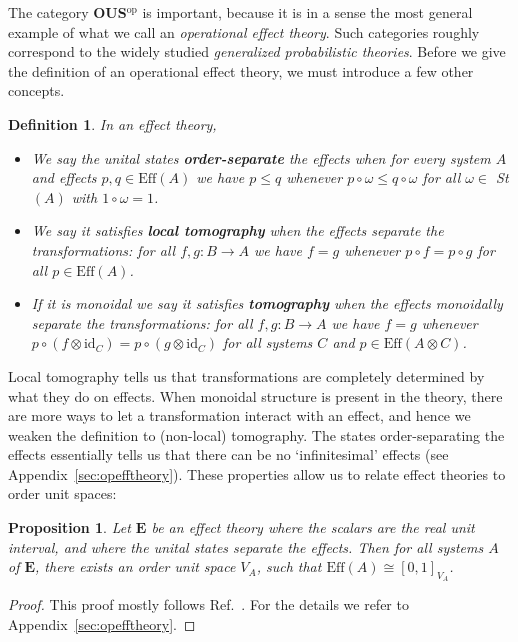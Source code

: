 \documentclass[a4paper,onecolumn,10pt,accepted=2019-05-03, issue=1, volume=1, shorttitle=papers/compositionality-1-1]{compositionalityarticle}
\newcounter{counter}
\numberwithin{counter}{section}
\newtheorem{proposition}[counter]{Proposition}
\newtheorem{definition}[counter]{Definition}
\newcommand{\pred}{\text{Eff}}
\newcommand{\id}{\text{id}}
\newcommand{\opp}{\text{op}}
\begin{document}
The category \textbf{OUS}$^\opp$ is important, because it is in a sense the most general example of what we call an \emph{operational effect theory}. Such categories roughly correspond to the widely studied \emph{generalized probabilistic theories}. Before we give the definition of an operational effect theory, we must introduce a few other concepts.
\begin{definition}
    In an effect theory,
    \begin{itemize}
        \item We say the unital states \textbf{order-separate} the effects when for every system $A$ and effects $p,q\in \pred(A)$ we have $p\leq q$ whenever $ p\circ \omega \leq q\circ \omega $ for all $\omega\in $ St$(A)$ with $1\circ\omega = 1$.
        \item We say it satisfies \textbf{local tomography} when the effects separate the transformations: for all $f,g: B\rightarrow A$ we have $f=g$ whenever $p\circ f = p\circ g$ for all $p\in \pred(A)$.
        \item If it is monoidal we say it satisfies \textbf{tomography} when the effects monoidally separate the transformations: for all $f,g: B\rightarrow A$ we have $f=g$ whenever $p\circ (f\otimes \id_C) = p\circ (g\otimes \id_C)$ for all systems $C$ and $p\in \pred(A\otimes C)$.
    \end{itemize}
\end{definition}

\noindent Local tomography tells us that transformations are completely determined by what they do on effects. When monoidal structure is present in the theory, there are more ways to let a transformation interact with an effect, and hence we weaken the definition to (non-local) tomography.
The states order-separating the effects essentially tells us that there can be no `infinitesimal' effects (see Appendix~\ref{sec:opefftheory}). These properties allow us to relate effect theories to order unit spaces:

\begin{proposition}
    Let $\mathbf{E}$ be an effect theory where the scalars are the real unit interval, and where the unital states separate the effects. Then for all systems $A$ of $\mathbf{E}$, there exists an order unit space $V_A$, such that $\pred(A) \cong [0,1]_{V_A}$.
\end{proposition}
\begin{proof}
    This proof mostly follows Ref.~\cite{jacobs2016expectation}. For the details we refer to Appendix~\ref{sec:opefftheory}.
\end{proof}
\end{document}

